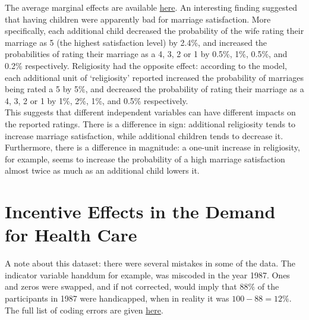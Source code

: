 \documentclass{article}
\begin{document}
\begin{enumerate}[label=(\alph*)]
The average marginal effects are available \hyperlink{oprobitame}{here}. An interesting finding suggested that having children were apparently bad for marriage satisfaction. More specifically, each additional child decreased the probability of the wife rating their marriage as 5 (the highest satisfaction level) by 2.4\%, and increased the probabilities of rating their marriage as a 4, 3, 2 or 1 by 0.5\%, 1\%, 0.5\%, and 0.2\% respectively. Religiosity had the opposite effect: according to the model, each additional unit of `religiosity' reported increased the probability of marriages being rated a 5 by 5\%, and decreased the probability of rating their marriage as a 4, 3, 2 or 1 by 1\%, 2\%, 1\%, and 0.5\% respectively.\\


This suggests that different independent variables can have different impacts on the reported ratings. There is a difference in sign: additional religiosity tends to increase marriage satisfaction, while additional children tends to decrease it. Furthermore, there is a difference in magnitude: a one-unit increase in religiosity, for example, seems to increase the probability of a high marriage satisfaction almost twice as much as an additional child lowers it. 

 

\end{enumerate}


\newpage
\section{Incentive Effects in the Demand for Health Care}

A note about this dataset: there were several mistakes in some of the data. The indicator variable handdum for example, was miscoded in the year 1987. Ones and zeros were swapped, and if not corrected, would imply that $88\%$ of the participants in 1987 were handicapped, when in reality it was $100 - 88 = 12\%$. The full list of coding errors are given \hyperlink{http://qed.econ.queensu.ca/jae/2003-v18.4/riphahn-wambach-million/readme.rwm.txt}{here}.\cite{riphahn2003incentive}
\end{document}
